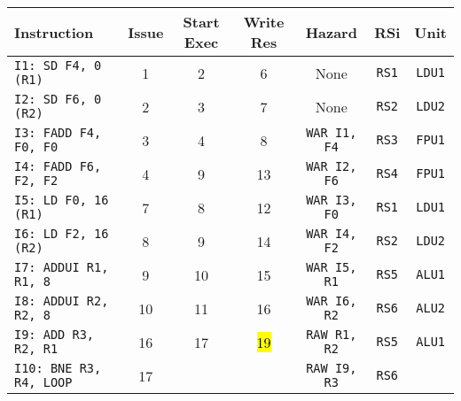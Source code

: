 \begin{enumerate}
    \begin{table}[!htp]
        \centering
        \begin{adjustbox}{width={\textwidth},totalheight={\textheight},keepaspectratio}
        \begin{tabular}{@{} l c c c c c c @{}}
            \toprule
            \textbf{Instruction} & \textbf{Issue} & \textbf{Start Exec} & \textbf{Write Res} & \textbf{Hazard} & \textbf{RSi} & \textbf{Unit} \\
            \midrule
            \texttt{I1: SD F4, 0 (R1)}      & 1 & 2 & 6 & None  & \texttt{RS1}   & \texttt{LDU1}  \\ [.5em]
            \texttt{I2: SD F6, 0 (R2)}      & 2 & 3 & 7 & None  & \texttt{RS2}   & \texttt{LDU2}  \\ [.5em]
            \texttt{I3: FADD F4, F0, F0}    & 3 & 4 & 8 & \texttt{WAR I1, F4}  & \texttt{RS3} & \texttt{FPU1} \\ [.5em]
            \texttt{I4: FADD F6, F2, F2}    & 4 & 9 & 13 & \texttt{WAR I2, F6} & \texttt{RS4} & \texttt{FPU1} \\ [.5em]
            \texttt{I5: LD F0, 16 (R1)}     & 7 & 8 & 12 & \texttt{WAR I3, F0} & \texttt{RS1} & \texttt{LDU1} \\ [.5em]
            \texttt{I6: LD F2, 16 (R2)}     & 8 & 9 & 14 & \texttt{WAR I4, F2} & \texttt{RS2} & \texttt{LDU2} \\ [.5em]
            \texttt{I7: ADDUI R1, R1, 8}    & 9 & 10 & 15 & \texttt{WAR I5, R1} & \texttt{RS5} & \texttt{ALU1} \\ [.5em]
            \texttt{I8: ADDUI R2, R2, 8}    & 10 & 11 & 16 & \texttt{WAR I6, R2} & \texttt{RS6} & \texttt{ALU2} \\ [.5em]
            \texttt{I9: ADD R3, R2, R1}     & 16 & 17 & \hl{19} & \texttt{RAW R1, R2} & \texttt{RS5} & \texttt{ALU1} \\ [.5em]
            \texttt{I10: BNE R3, R4, LOOP}   & 17 &   &   & \texttt{RAW I9, R3} & \texttt{RS6} &       \\
            \bottomrule
        \end{tabular}
        \end{adjustbox}
    \end{table}
    

\end{enumerate}
